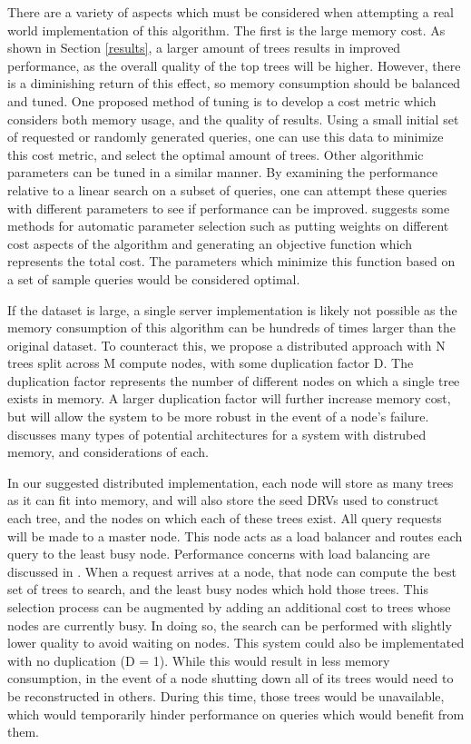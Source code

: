 There are a variety of aspects which must be considered when attempting a real world implementation of this algorithm.  The first is the large memory cost.  As shown in Section \ref{results}, a larger amount of trees results in improved performance, as the overall quality of the top trees will be higher.  However, there is a diminishing return of this effect, so memory consumption should be balanced and tuned.  One proposed method of tuning is to develop a cost metric which considers both memory usage, and the quality of results.  Using a small initial set of requested or randomly generated queries, one can use this data to minimize this cost metric, and select the optimal amount of trees.  Other algorithmic parameters can be tuned in a similar manner.  By examining the performance relative to a linear search on a subset of queries, one can attempt these queries with different parameters to see if performance can be improved.  \citep{muja_flann_2009} suggests some methods for automatic parameter selection such as putting weights on different cost aspects of the algorithm and generating an objective function which represents the total cost.  The parameters which minimize this function based on a set of sample queries would be considered optimal.

If the dataset is large, a single server implementation is likely not possible as the memory consumption of this algorithm can be hundreds of times larger than the original dataset.  To counteract this, we propose a distributed approach with N trees split across M compute nodes, with some duplication factor D.  The duplication factor represents the number of different nodes on which a single tree exists in memory.  A larger duplication factor will further increase memory cost, but will allow the system to be more robust in the event of a node's failure.  \citep{nitzberg1991distributed} discusses many types of potential architectures for a system with distrubed memory, and considerations of each.

In our suggested distributed implementation, each node will store as many trees as it can fit into memory, and will also store the seed DRVs used to construct each tree, and the nodes on which each of these trees exist.  All query requests will be made to a master node.  This node acts as a load balancer and routes each query to the least busy node.  Performance concerns with load balancing are discussed in \citep{cybenko1989dynamic}.  When a request arrives at a node, that node can compute the best set of trees to search, and the least busy nodes which hold those trees.  This selection process can be augmented by adding an additional cost to trees whose nodes are currently busy.  In doing so, the search can be performed with slightly lower quality to avoid waiting on nodes.  This system could also be implementated with no duplication (D = 1).  While this would result in less memory consumption, in the event of a node shutting down all of its trees would need to be reconstructed in others.  During this time, those trees would be unavailable, which would temporarily hinder performance on queries which would benefit from them.

